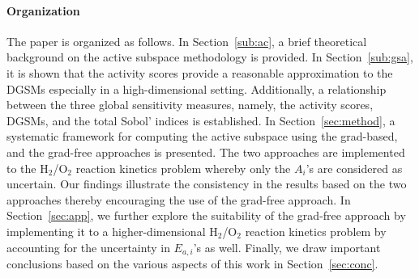  \paragraph{Organization}
 The paper is organized as follows. In Section~\ref{sub:ac}, a brief theoretical background on
 the active subspace methodology is provided. In Section~\ref{sub:gsa}, it is shown that the activity
 scores provide a reasonable approximation to the DGSMs especially in a high-dimensional setting. 
 Additionally, a relationship between the three global sensitivity measures, namely, the activity scores,
 DGSMs, and the total Sobol' indices is established. In Section~\ref{sec:method}, a systematic framework
 for computing the active subspace using the grad-based, and the grad-free approaches is presented. 
The two approaches are implemented to the H$_2$/O$_2$ reaction kinetics problem whereby only
the $A_i$'s are considered as uncertain. Our findings illustrate the consistency in the results based on
the two approaches thereby encouraging the use of the grad-free approach. In Section~\ref{sec:app},
we further explore the suitability of the grad-free approach by implementing it to a higher-dimensional
H$_2$/O$_2$ reaction kinetics problem by accounting for the uncertainty in $E_{a,i}$'s as well. 
Finally, we draw important conclusions based on the various aspects of this work in Section~\ref{sec:conc}.










 




